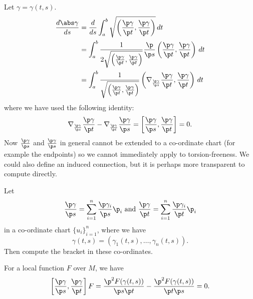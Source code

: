 Let $\gamma=\gamma(t,s)$.
\begin{align*}
  \frac{d\abs\gamma}{ds} &= \frac{d}{ds} \int_a^b \sqrt{\left( \frac{\p\gamma}{\p t},\frac{\p\gamma}{\p t} \right)} \, dt \\
  &= \int_a^b \frac{1}{2\sqrt{\left( \frac{\p\gamma}{\p t},\frac{\p\gamma}{\p t} \right)}} \frac{\p}{\p s} \left( \frac{\p\gamma}{\p t},\frac{\p\gamma}{\p t} \right) \, dt \\
  &= \int_a^b \frac{1}{\sqrt{\left( \frac{\p\gamma}{\p t},\frac{\p\gamma}{\p t} \right)}} \left( \nabla_{\frac{\p\gamma}{\p s}} \frac{\p\gamma}{\p t},\frac{\p\gamma}{\p t} \right) \, dt
\end{align*}
where we have used the following identity:
\[ \nabla_{\frac{\p\gamma}{\p s}}\frac{\p\gamma}{\p t} - \nabla_{\frac{\p\gamma}{\p t}}\frac{\p\gamma}{\p s} = \left[ \frac{\p\gamma}{\p s}, \frac{\p\gamma}{\p t} \right] = 0. \]
Now $\tfrac{\p\gamma}{\p s}$ and $\tfrac{\p\gamma}{\p s}$ in general cannot be extended to a co-ordinate chart (for example the endpoints) so we cannot immediately apply to torsion-freeness.
We could also define an induced connection, but it is perhaps more transparent to compute directly.

\begin{enum}
  \io
  Let
  \[ \frac{\p\gamma}{\p s} = \sum_{i=1}^n \frac{\p\gamma_i}{\p s}\p_i \text{ and } \frac{\p\gamma}{\p t} = \sum_{i=1}^n \frac{\p\gamma_i}{\p t}\p_i \] 
  in a co-ordinate chart $\{u_i\}_{i=1}^n$, where we have
  \[ \gamma(t,s) = \left( \gamma_1(t,s),\ldots,\gamma_n(t,s) \right). \]
  Then compute the bracket in these co-ordinates.

  \io
  For a local function $F$ over $M$, we have
  \[ \left[ \frac{\p\gamma}{\p s}, \frac{\p\gamma}{\p t} \right]F = \frac{\p^2 F(\gamma(t,s))}{\p s\p t} - \frac{\p^2F(\gamma(t,s))}{\p t\p s} = 0. \]
\end{enum}
